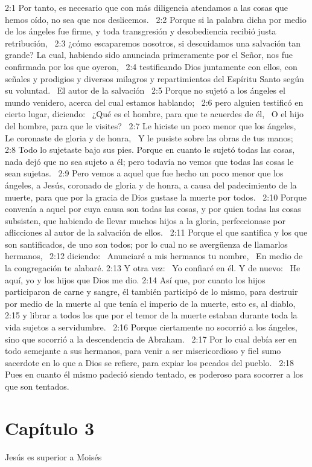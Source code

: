 2:1 Por tanto, es necesario que con más diligencia atendamos a las cosas que hemos oído, no sea que nos deslicemos.  
2:2 Porque si la palabra dicha por medio de los ángeles fue firme, y toda transgresión y desobediencia recibió justa retribución,  
2:3 ¿cómo escaparemos nosotros, si descuidamos una salvación tan grande? La cual, habiendo sido anunciada primeramente por el Señor, nos fue confirmada por los que oyeron,  
2:4 testificando Dios juntamente con ellos, con señales y prodigios y diversos milagros y repartimientos del Espíritu Santo según su voluntad.  
El autor de la salvación  
2:5 Porque no sujetó a los ángeles el mundo venidero, acerca del cual estamos hablando;  
2:6 pero alguien testificó en cierto lugar, diciendo:  
¿Qué es el hombre, para que te acuerdes de él,  
O el hijo del hombre, para que le visites?  
2:7 Le hiciste un poco menor que los ángeles,  
Le coronaste de gloria y de honra,  
Y le pusiste sobre las obras de tus manos;  
2:8 Todo lo sujetaste bajo sus pies. 
Porque en cuanto le sujetó todas las cosas, nada dejó que no sea sujeto a él; pero todavía no vemos que todas las cosas le sean sujetas.  
2:9 Pero vemos a aquel que fue hecho un poco menor que los ángeles, a Jesús, coronado de gloria y de honra, a causa del padecimiento de la muerte, para que por la gracia de Dios gustase la muerte por todos.  
2:10 Porque convenía a aquel por cuya causa son todas las cosas, y por quien todas las cosas subsisten, que habiendo de llevar muchos hijos a la gloria, perfeccionase por aflicciones al autor de la salvación de ellos.  
2:11 Porque el que santifica y los que son santificados, de uno son todos; por lo cual no se avergüenza de llamarlos hermanos,  
2:12 diciendo:  
Anunciaré a mis hermanos tu nombre,  
En medio de la congregación te alabaré. 
2:13 Y otra vez:  
Yo confiaré en él. 
Y de nuevo:  
He aquí, yo y los hijos que Dios me dio. 
2:14 Así que, por cuanto los hijos participaron de carne y sangre, él también participó de lo mismo, para destruir por medio de la muerte al que tenía el imperio de la muerte, esto es, al diablo,  
2:15 y librar a todos los que por el temor de la muerte estaban durante toda la vida sujetos a servidumbre.  
2:16 Porque ciertamente no socorrió a los ángeles, sino que socorrió a la descendencia de Abraham.  
2:17 Por lo cual debía ser en todo semejante a sus hermanos, para venir a ser misericordioso y fiel sumo sacerdote en lo que a Dios se refiere, para expiar los pecados del pueblo.  
2:18 Pues en cuanto él mismo padeció siendo tentado, es poderoso para socorrer a los que son tentados.  
\section*{Capítulo 3}
Jesús es superior a Moisés  

